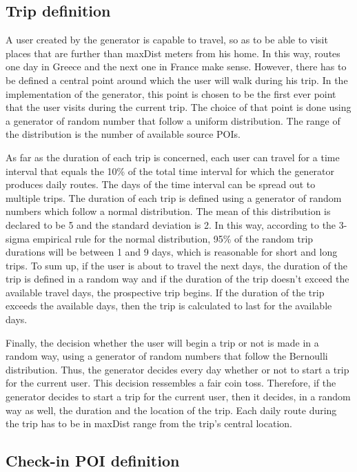 \subsection{Trip definition}

A user created by the generator is capable to travel, so as to be able to visit places that are further than maxDist meters from his home. In this way, 
routes one day in Greece and the next one in France make sense. However, there has to be defined a central point around which the user will walk during his trip. 
In the implementation of the generator, this point is chosen to be the first ever point that the user visits during the current trip. 
The choice of that point is done using a generator of random number that follow a uniform distribution. The range of the distribution is the number 
of available source POIs.

As far as the duration of each trip is concerned, each user can travel for a time interval that equals the 10\% of the total time interval for which the generator 
produces daily routes. The days of the time interval can be spread out to multiple trips. The duration of each trip is defined using a generator of random numbers 
which follow a normal distribution. The mean of this distribution is declared to be 5 and the standard deviation is 2. In this way, according to the 
3-sigma empirical rule for the normal distribution, 95\% of the random trip durations will be between 1 and 9 days, which is reasonable for short and long trips. 
To sum up, if the user is about to travel the next days, the duration of the trip is defined in a random way and if the duration of the trip doesn't exceed the 
available travel days, the prospective trip begins. If the duration of the trip exceeds the available days, then the trip is calculated to last for the 
available days.

Finally, the decision whether the user will begin a trip or not is made in a random way, using a generator of random numbers that follow the Bernoulli distribution. 
Thus, the generator decides every day whether or not to start a trip for the current user. This decision ressembles a fair coin toss. Therefore, 
if the generator decides to start a trip for the current user, then it decides, in a random way as well, the duration and the location of the trip. Each 
daily route during the trip has to be in maxDist range from the trip's central location.

\subsection{Check-in POI definition}

